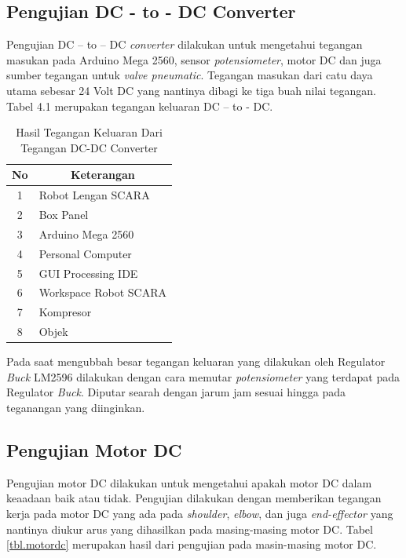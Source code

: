 \subsection{Pengujian DC - to - DC Converter}
Pengujian DC – to – DC \textit{converter} dilakukan untuk mengetahui tegangan masukan pada Arduino Mega 2560, sensor \textit{potensiometer}, motor DC dan juga sumber tegangan untuk\textit{ valve pneumatic}. Tegangan masukan dari catu daya utama sebesar 24 Volt DC yang nantinya dibagi ke tiga buah nilai tegangan. Tabel 4.1 merupakan tegangan keluaran DC – to - DC.

\begin{table}[H]
	\centering
	\caption{Hasil Tegangan Keluaran Dari Tegangan DC-DC Converter}
	
	\begin{tabular}{|c|l|}
		\hline
		\rowcolor[HTML]{9B9B9B} 
		No & \multicolumn{1}{c|}{\cellcolor[HTML]{9B9B9B}Keterangan} \\ \hline
		1  & Robot Lengan SCARA                                      \\ \hline
		2  & Box Panel                                               \\ \hline
		3  & Arduino Mega 2560                                       \\ \hline
		4  & Personal Computer                                       \\ \hline
		5  & GUI Processing IDE                                      \\ \hline
		6  & Workspace Robot SCARA                                   \\ \hline
		7  & Kompresor                                               \\ \hline
		8  & Objek                                                   \\ \hline
	\end{tabular}
	
\end{table} 

Pada saat mengubbah besar tegangan keluaran yang dilakukan oleh Regulator \textit{Buck} LM2596 dilakukan dengan cara memutar \textit{potensiometer} yang terdapat pada Regulator \textit{Buck}. Diputar searah dengan jarum jam sesuai hingga pada teganangan yang diinginkan.
\subsection{Pengujian Motor DC}
Pengujian motor DC dilakukan untuk mengetahui apakah motor DC dalam keaadaan baik atau tidak. Pengujian dilakukan dengan memberikan tegangan kerja pada motor DC yang ada pada \textit{shoulder}, \textit{elbow}, dan juga \textit{end-effector} yang nantinya diukur arus yang dihasilkan pada masing-masing motor DC. Tabel \ref{tbl.motordc} merupakan hasil dari pengujian pada masin-masing motor DC.

